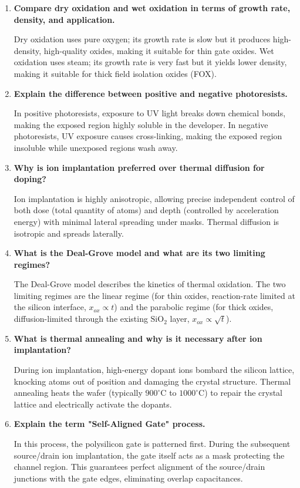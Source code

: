 \documentclass[12pt,a4paper]{article}
\newcommand{\Q}[1]{\textbf{#1}\par\noindent\ignorespaces}
\begin{document}
\begin{tcolorbox}[exambox, title={\textbf{Frequently Asked / Viva Questions}}]
\begin{enumerate}[topsep=0pt, label=\textbf{Q\arabic*.}, itemsep=5pt]
  \item \Q{Compare dry oxidation and wet oxidation in terms of growth rate, density, and application.}
    Dry oxidation uses pure oxygen; its growth rate is slow but it produces high-density, high-quality oxides, making it suitable for thin gate oxides. Wet oxidation uses steam; its growth rate is very fast but it yields lower density, making it suitable for thick field isolation oxides (FOX).
  \item \Q{Explain the difference between positive and negative photoresists.}
    In positive photoresists, exposure to UV light breaks down chemical bonds, making the exposed region highly soluble in the developer. In negative photoresists, UV exposure causes cross-linking, making the exposed region insoluble while unexposed regions wash away.
  \item \Q{Why is ion implantation preferred over thermal diffusion for doping?}
    Ion implantation is highly anisotropic, allowing precise independent control of both dose (total quantity of atoms) and depth (controlled by acceleration energy) with minimal lateral spreading under masks. Thermal diffusion is isotropic and spreads laterally.
  \item \Q{What is the Deal-Grove model and what are its two limiting regimes?}
    The Deal-Grove model describes the kinetics of thermal oxidation. The two limiting regimes are the linear regime (for thin oxides, reaction-rate limited at the silicon interface, $x_{ox} \propto t$) and the parabolic regime (for thick oxides, diffusion-limited through the existing $\text{SiO}_2$ layer, $x_{ox} \propto \sqrt{t}$).
  \item \Q{What is thermal annealing and why is it necessary after ion implantation?}
    During ion implantation, high-energy dopant ions bombard the silicon lattice, knocking atoms out of position and damaging the crystal structure. Thermal annealing heats the wafer (typically $900^\circ\text{C}$ to $1000^\circ\text{C}$) to repair the crystal lattice and electrically activate the dopants.
  \item \Q{Explain the term "Self-Aligned Gate" process.}
    In this process, the polysilicon gate is patterned first. During the subsequent source/drain ion implantation, the gate itself acts as a mask protecting the channel region. This guarantees perfect alignment of the source/drain junctions with the gate edges, eliminating overlap capacitances.

\end{enumerate}
\end{tcolorbox}
\end{document}
